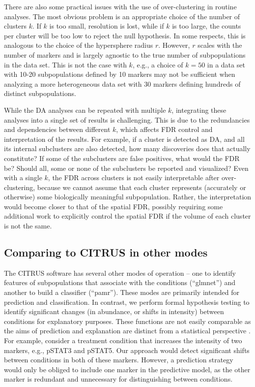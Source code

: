 \documentclass{article}
\begin{document}
There are also some practical issues with the use of over-clustering in routine analyses.
The most obvious problem is an appropriate choice of the number of clusters $k$.
If $k$ is too small, resolution is lost, while if $k$ is too large, the counts per cluster will be too low to reject the null hypothesis.
In some respects, this is analogous to the choice of the hypersphere radius $r$.
However, $r$ scales with the number of markers and is largely agnostic to the true number of subpopulations in the data set.
This is not the case with $k$, e.g., a choice of $k=50$ in a data set with 10-20 subpopulations defined by 10 markers may not be sufficient when analyzing a more heterogeneous data set with 30 markers defining hundreds of distinct subpopulations.

While the DA analyses can be repeated with multiple $k$, integrating these analyses into a single set of results is challenging.
This is due to the redundancies and dependencies between different $k$, which affects FDR control and interpretation of the results.
For example, if a cluster is detected as DA, and all its internal subclusters are also detected, how many discoveries does that actually constitute?
If some of the subclusters are false positives, what would the FDR be?
Should all, some or none of the subclusters be reported and visualized?
Even with a single $k$, the FDR across clusters is not easily interpretable after over-clustering, because we cannot assume that each cluster represents (accurately or otherwise) some biologically meaningful subpopulation.
Rather, the interpretation would become closer to that of the spatial FDR, possibly requiring some additional work to explicitly control the spatial FDR if the volume of each cluster is not the same.

\subsection{Comparing to CITRUS in other modes}
The CITRUS software has several other modes of operation -- one to identify features of subpopulations that associate with the conditions (``glmnet'') and another to build a classifier (``pamr'').
These modes are primarily intended for prediction and classification.
In contrast, we perform formal hypothesis testing to identify significant changes (in abundance, or shifts in intensity) between conditions for explanatory purposes.
These functions are not easily comparable as the aims of prediction and explanation are distinct from a statistical perspective \cite{shmueli2010explain}.
For example, consider a treatment condition that increases the intensity of two markers, e.g., pSTAT3 and pSTAT5.
Our approach would detect significant shifts between conditions in both of these markers.
However, a prediction strategy would only be obliged to include one marker in the predictive model, as the other marker is redundant and unnecessary for distinguishing between conditions.
\end{document}
